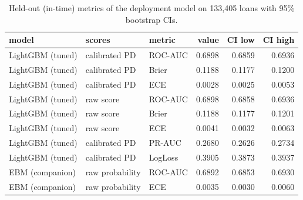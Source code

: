 \begin{table}[t]
\centering
\caption{Held-out (in-time) metrics of the deployment model on 133,405 loans with 95\% bootstrap CIs.}
\label{tab:T12e_deployment_model}
\small
\begin{tabular}{lllrrr}
\toprule
model & scores & metric & value & CI low & CI high \\
\midrule
LightGBM (tuned) & calibrated PD & ROC-AUC & 0.6898 & 0.6859 & 0.6936 \\
LightGBM (tuned) & calibrated PD & Brier & 0.1188 & 0.1177 & 0.1200 \\
LightGBM (tuned) & calibrated PD & ECE & 0.0028 & 0.0025 & 0.0053 \\
LightGBM (tuned) & raw score & ROC-AUC & 0.6898 & 0.6858 & 0.6936 \\
LightGBM (tuned) & raw score & Brier & 0.1188 & 0.1177 & 0.1201 \\
LightGBM (tuned) & raw score & ECE & 0.0041 & 0.0032 & 0.0063 \\
LightGBM (tuned) & calibrated PD & PR-AUC & 0.2680 & 0.2626 & 0.2734 \\
LightGBM (tuned) & calibrated PD & LogLoss & 0.3905 & 0.3873 & 0.3937 \\
EBM (companion) & raw probability & ROC-AUC & 0.6892 & 0.6853 & 0.6930 \\
EBM (companion) & raw probability & ECE & 0.0035 & 0.0030 & 0.0060 \\
\bottomrule
\end{tabular}
\end{table}
